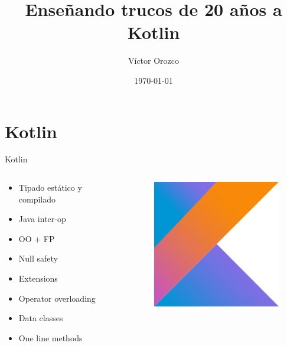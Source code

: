 \documentclass{beamer}
\title{Enseñando trucos de 20 años a Kotlin}
\author{Víctor Orozco}
\institute{@tuxtor}
\date{\today}
\begin{document}
\frame{\titlepage}

\section{Kotlin}

\begin{frame}{Kotlin}
\begin{columns}
	\begin{column}{0.5\textwidth}
		\begin{itemize}
			\item Tipado estático y compilado
			\item Java inter-op
			\item OO + FP
			\item Null safety
			\item Extensions
			\item Operator overloading
			\item Data classes
			\item One line methods
		\end{itemize}
	\end{column}
	\begin{column}{0.5\textwidth}  %
		\begin{figure}
			\centering
			\includegraphics[width=0.7\linewidth]{Images/kotlin}
		\end{figure}
	\end{column}
\end{columns}
\end{frame}
\end{document}
